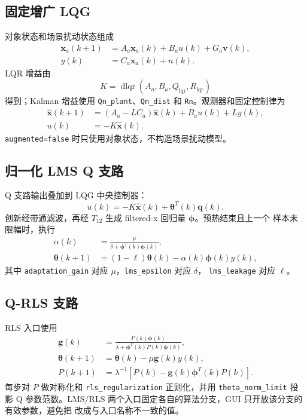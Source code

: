 \documentclass[UTF8,11pt,a4paper]{ctexart}
\begin{document}
\subsection{固定增广 LQG}

对象状态和场景扰动状态组成
\begin{align}
\bm x_a(k+1)&=A_a\bm x_a(k)+B_au(k)+G_a\bm v(k),\\
y(k)&=C_a\bm x_a(k)+n(k).
\end{align}
LQR 增益由
\begin{equation}
K=\operatorname{dlqr}(A_a,B_a,Q_{\mathrm{lqr}},R_{\mathrm{lqr}})
\end{equation}
得到；Kalman 增益使用 \texttt{Qn\_plant}、\texttt{Qn\_dist} 和
\texttt{Rn}。观测器和固定控制律为
\begin{align}
\hat{\bm x}(k+1)&=(A_a-LC_a)\hat{\bm x}(k)+B_au(k)+Ly(k),\\
u(k)&=-K\hat{\bm x}(k).
\end{align}
\texttt{augmented=false} 时只使用对象状态，不构造场景扰动模型。

\subsection{归一化 LMS Q 支路}

Q 支路输出叠加到 LQG 中央控制器：
\begin{equation}
u(k)=-K\hat{\bm x}(k)+\bm\theta^T(k)\bm q(k).
\end{equation}
创新经带通滤波，再经 $T_{12}$ 生成 filtered-x 回归量 $\bm\phi$。预热结束且上一个
样本未限幅时，执行
\begin{align}
\alpha(k)&=\frac{\mu}{\delta+\bm\phi^T(k)\bm\phi(k)},\\
\bm\theta(k+1)&=(1-\ell)\bm\theta(k)-\alpha(k)\bm\phi(k)y(k),
\end{align}
其中 \texttt{adaptation\_gain} 对应 $\mu$，\texttt{lms\_epsilon} 对应 $\delta$，
\texttt{lms\_leakage} 对应 $\ell$。

\subsection{Q-RLS 支路}

RLS 入口使用
\begin{align}
\bm g(k)&=\frac{P(k)\bm\phi(k)}{\lambda+\bm\phi^T(k)P(k)\bm\phi(k)},\\
\bm\theta(k+1)&=\bm\theta(k)-\mu\bm g(k)y(k),\\
P(k+1)&=\lambda^{-1}[P(k)-\bm g(k)\bm\phi^T(k)P(k)].
\end{align}
每步对 $P$ 做对称化和 \texttt{rls\_regularization} 正则化，并用
\texttt{theta\_norm\_limit} 投影 Q 参数范数。LMS/RLS 两个入口固定各自的算法分支，GUI
只开放该分支的有效参数，避免把  改成与入口名称不一致的值。
\end{document}
